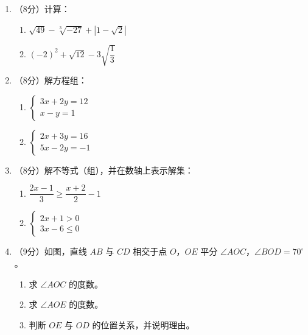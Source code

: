 \documentclass[12pt, a4paper]{ctexart}
\begin{document}
\begin{enumerate}[label=\textbf{\arabic*.}, leftmargin=2.5em, resume]

\item （8分）计算：
\begin{enumerate}[label=(\arabic*), nosep]
\item $\sqrt{49} - \sqrt[3]{-27} + |1 - \sqrt{2}|$
\item $(-2)^2 + \sqrt{12} - 3\sqrt{\dfrac{1}{3}}$
\end{enumerate}
\vspace{6cm}

\item （8分）解方程组：
\begin{enumerate}[label=(\arabic*), nosep]
\item $\begin{cases} 3x + 2y = 12 \\ x - y = 1 \end{cases}$
\item $\begin{cases} 2x + 3y = 16 \\ 5x - 2y = -1 \end{cases}$
\end{enumerate}
\vspace{6cm}

\item （8分）解不等式（组），并在数轴上表示解集：
\begin{enumerate}[label=(\arabic*), nosep]
\item $\dfrac{2x-1}{3} \geqslant \dfrac{x+2}{2} - 1$
\item $\begin{cases} 2x + 1 > 0 \\ 3x - 6 \leqslant 0 \end{cases}$
\end{enumerate}
\vspace{6cm}

\item （9分）如图，直线 $AB$ 与 $CD$ 相交于点 $O$，$OE$ 平分 $\angle AOC$，$\angle BOD = 70^{\circ}$。
\begin{enumerate}[label=(\arabic*), nosep]
\item 求 $\angle AOC$ 的度数。
\item 求 $\angle AOE$ 的度数。
\item 判断 $OE$ 与 $OD$ 的位置关系，并说明理由。
\end{enumerate}
\vspace{6cm}


\end{enumerate}
\end{document}
